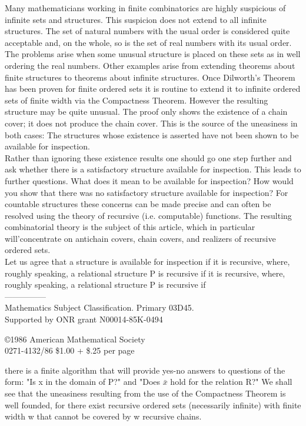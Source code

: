 \documentclass[twoside]{article}
\begin{document}
Many mathematicians working in finite combinatorics are highly suspicious of infinite sets and structures.   This suspicion does not extend to all infinite structures.   
The set of natural numbers with the usual order is considered quite acceptable and, on the whole, so is the set of real numbers with its usual order.   
The problems arise when some unusual structure is placed on these sets as in well ordering the real numbers.   
Other examples arise from extending theorems about finite structures to theorems about infinite   structures.    
Once Dilworth's Theorem has been proven for finite ordered sets it is routine to extend it to infinite ordered sets of finite width via the Compactness Theorem.   
However the resulting structure may be quite unusual.   
The proof only shows the existence of a chain cover; it does not produce the chain cover.   
This is the source of the uneasiness in both cases:    The structures whose existence is asserted have not been shown to be available for inspection.\\
\indent
Rather than ignoring these existence results one should go one step further and ask whether there is a satisfactory structure available for inspection. 
This leads to further questions. What does it mean to be available for inspection? 
How would you show that there was no satisfactory structure available for inspection? 
For countable structures these concerns can be made precise and can often be resolved using the theory of recursive (i.e. computable) functions.   
The resulting combinatorial theory is the subject of this article, which in particular will'concentrate on antichain covers, chain covers, and realizers of recursive ordered sets.\\
\indent
Let us agree that a structure is available for inspection if it is recursive, where, roughly speaking, a relational structure   P   is recursive if it is recursive, where, roughly speaking, a relational structure P is recursive if\\
---------------\\
{\footnotesize {} Mathematics Subject Classification. Primary 03D45.\\
\indent Supported by ONR grant N00014-85K-0494}
\begin{flushright}
{\footnotesize \copyright 1986 American Mathematical Society\\ 0271-4132/86 \$1.00 + \$.25 per page}
\end{flushright}
\onehalfspacing
\newpage
%
%
\addtolength{\voffset}{1.5cm}
\noindent there is a finite algorithm that will provide yes-no answers to questions of the form:  "Is    x    in the domain of    P?" and "Does $\bar{x}$    hold for the relation R?"  We shall see that the uneasiness resulting from the use of the Compactness Theorem is well founded,  for there exist recursive ordered sets (necessarily infinite) with finite width   w   that   cannot be covered by w recursive chains.    
\end{document}
